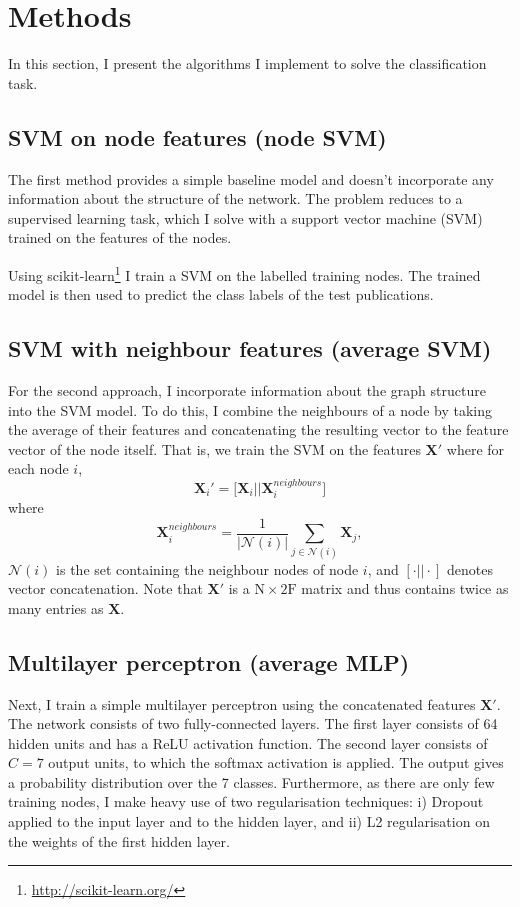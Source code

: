 \documentclass[12pt]{article}
\theoremstyle{definition}
\begin{document}
\section{Methods}
In this section, I present the algorithms I implement to solve the classification task.

\subsection{SVM on node features (node SVM)}
The first method provides a simple baseline model and doesn't incorporate any information about the structure of the network. The problem reduces to a supervised learning task, which I solve with a support vector machine (SVM) trained on the features of the nodes.
\bigskip

Using scikit-learn\footnote{\url{http://scikit-learn.org/}} \cite{scikit-learn} I train a SVM on the labelled training nodes. The trained model is then used to predict the class labels of the test publications.

\subsection{SVM with neighbour features (average SVM)}
\label{section/average_svm}
For the second approach, I incorporate information about the graph structure into the SVM model. To do this, I combine the neighbours of a node by taking the average of their features and concatenating the resulting vector to the feature vector of the node itself. That is, we train the SVM on the features $\mathbf{X}'$ where for each node $i$,
\[
	\mathbf{X}_i' = \big[\mathbf{X}_i \big\vert \big\vert \mathbf{X}^{\mathit{neighbours}}_i \big]
\]
where
\[
	\mathbf{X}^{\mathit{neighbours}}_i  = \frac{1}{\left\vert \mathcal{N}(i) \right\vert} \sum_{j \in \mathcal{N}(i)} \mathbf{X}_j,
\]
$\mathcal{N}(i)$ is the set containing the neighbour nodes of node $i$, and $[\cdot \vert\vert \cdot ]$ denotes vector concatenation. Note that $\mathbf{X}'$ is a $\textrm{N} \times 2 \textrm{F}$ matrix and thus contains twice as many entries as $\mathbf{X}$.

\subsection{Multilayer perceptron (average MLP)}
Next, I train a simple multilayer perceptron using the concatenated features $\mathbf{X}'$. The network consists of two fully-connected layers. The first layer consists of 64 hidden units and has a ReLU activation function. The second layer consists of $C=7$ output units, to which the softmax activation is applied. The output gives a probability distribution over the 7 classes. Furthermore, as there are only few training nodes, I make heavy use of two regularisation techniques: i) Dropout \cite{srivastava2014dropout} applied to the input layer and to the hidden layer, and ii) L2 regularisation on the weights of the first hidden layer.
\end{document}
